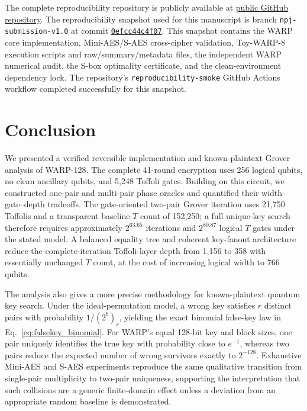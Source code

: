 \documentclass[pdflatex,sn-nature]{sn-jnl}
\theoremstyle{thmstyleone}
\theoremstyle{thmstyletwo}
\begin{document}
The complete reproducibility repository is publicly available at \href{https://github.com/Indranil872001/warp-quantum-cryptanalysis}{public GitHub repository}. The reproducibility snapshot used for this manuscript is branch \texttt{npj-submission-v1.0} at commit \href{https://github.com/Indranil872001/warp-quantum-cryptanalysis/tree/0efcc44c4f073acd6c15c8fb8ef98c922187a2b3}{\texttt{0efcc44c4f07}}. This snapshot contains the WARP core implementation, Mini-AES/S-AES cross-cipher validation, Toy-WARP-8 execution scripts and raw/summary/metadata files, the independent WARP numerical audit, the S-box optimality certificate, and the clean-environment dependency lock. The repository's \texttt{reproducibility-smoke} GitHub Actions workflow completed successfully for this snapshot.


\section{Conclusion}

We presented a verified reversible implementation and known-plaintext Grover analysis of WARP-128.  The complete 41-round encryption uses 256 logical qubits, no clean ancillary qubits, and 5,248 Toffoli gates.  Building on this circuit, we constructed one-pair and multi-pair phase oracles and quantified their width--gate--depth tradeoffs.  The gate-oriented two-pair Grover iteration uses 21,750 Toffolis and a transparent baseline $T$ count of 152,250; a full unique-key search therefore requires approximately $2^{63.65}$ iterations and $2^{80.87}$ logical $T$ gates under the stated model.  A balanced equality tree and coherent key-fanout architecture reduce the complete-iteration Toffoli-layer depth from 1,156 to 358 with essentially unchanged $T$ count, at the cost of increasing logical width to 766 qubits.

The analysis also gives a more precise methodology for known-plaintext quantum key search.  Under the ideal-permutation model, a wrong key satisfies $r$ distinct pairs with probability $1/(2^b)_r$, yielding the exact binomial false-key law in Eq.~\eqref{eq:falsekey_binomial}.  For WARP's equal 128-bit key and block sizes, one pair uniquely identifies the true key with probability close to $e^{-1}$, whereas two pairs reduce the expected number of wrong survivors exactly to $2^{-128}$.  Exhaustive Mini-AES and S-AES experiments reproduce the same qualitative transition from single-pair multiplicity to two-pair uniqueness, supporting the interpretation that such collisions are a generic finite-domain effect unless a deviation from an appropriate random baseline is demonstrated.
\end{document}
